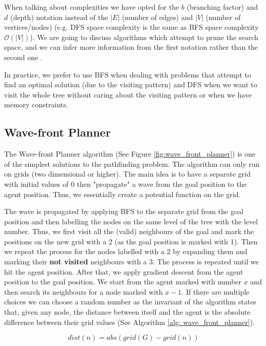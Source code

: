 When talking about complexities we have opted for the $b$ (branching factor) and $d$ (depth) notation instead of the $|E|$ (number of edges) and $|V|$ (number of vertices/nodes) (e.g. DFS space complexity is the same as BFS space complexity $\mathcal{O}(|V|)$). We are going to discuss algorithms which attempt to prune the search space, and we can infer more information from the first notation rather than the second one \cite{Cormen:2009:IAT:1614191}.

In practice, we prefer to use BFS when dealing with problems that attempt to find an optimal solution (due to the visiting pattern) and DFS when we want to visit the whole tree without caring about the visiting pattern or when we have memory constraints.

\subsection{Wave-front Planner} \label{sec: wave-front}
The Wave-front Planner algorithm \cite{choset2005principles, luo2014effective} (See Figure \ref{fig:wave_front_planner}) is one of the simplest solutions to the pathfinding problem. The algorithm can only run on grids (two dimensional or higher). The main idea is to have a separate grid with initial values of 0 then "propagate" a wave from the goal position to the agent position. Thus, we essentially create a potential function on the grid. 

The wave is propagated by applying BFS to the separate grid from the goal position and then labelling the nodes on the same level of the tree with the level number. Thus, we first visit all the (valid) neighbours of the goal and mark the positions on the new grid with a 2 (as the goal position is marked with 1). Then we repeat the process for the nodes labelled with a 2 by expanding them and marking their \textbf{not visited} neighbours with a 3. The process is repeated until we hit the agent position. After that, we apply gradient descent from the agent position to the goal position. We start from the agent marked with number $x$ and then search its neighbours for a node marked with $x-1$. If there are multiple choices we can choose a random number as the invariant of the algorithm states that, given any node, the distance between itself and the agent is the absolute difference between their grid values (See Algorithm \ref{alg: wave_front_planner}).

\vspace{-0.5cm}
$$dist(n) = abs(grid(G) - grid(n))$$
\vspace{-0.5cm}

